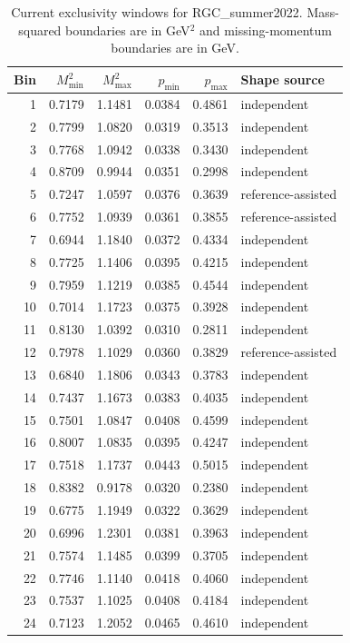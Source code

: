 \clearpage
\begin{longtable}{rrrrrl}
\caption{Current exclusivity windows for RGC\_summer2022. Mass-squared boundaries are in GeV$^2$ and missing-momentum boundaries are in GeV.}\\
\toprule Bin & $M^2_{\min}$ & $M^2_{\max}$ & $p_{\min}$ & $p_{\max}$ & Shape source\\\midrule\endhead
1 & 0.7179 & 1.1481 & 0.0384 & 0.4861 & independent\\
2 & 0.7799 & 1.0820 & 0.0319 & 0.3513 & independent\\
3 & 0.7768 & 1.0942 & 0.0338 & 0.3430 & independent\\
4 & 0.8709 & 0.9944 & 0.0351 & 0.2998 & independent\\
5 & 0.7247 & 1.0597 & 0.0376 & 0.3639 & reference-assisted\\
6 & 0.7752 & 1.0939 & 0.0361 & 0.3855 & reference-assisted\\
7 & 0.6944 & 1.1840 & 0.0372 & 0.4334 & independent\\
8 & 0.7725 & 1.1406 & 0.0395 & 0.4215 & independent\\
9 & 0.7959 & 1.1219 & 0.0385 & 0.4544 & independent\\
10 & 0.7014 & 1.1723 & 0.0375 & 0.3928 & independent\\
11 & 0.8130 & 1.0392 & 0.0310 & 0.2811 & independent\\
12 & 0.7978 & 1.1029 & 0.0360 & 0.3829 & reference-assisted\\
13 & 0.6840 & 1.1806 & 0.0343 & 0.3783 & independent\\
14 & 0.7437 & 1.1673 & 0.0383 & 0.4035 & independent\\
15 & 0.7501 & 1.0847 & 0.0408 & 0.4599 & independent\\
16 & 0.8007 & 1.0835 & 0.0395 & 0.4247 & independent\\
17 & 0.7518 & 1.1737 & 0.0443 & 0.5015 & independent\\
18 & 0.8382 & 0.9178 & 0.0320 & 0.2380 & independent\\
19 & 0.6775 & 1.1949 & 0.0322 & 0.3629 & independent\\
20 & 0.6996 & 1.2301 & 0.0381 & 0.3963 & independent\\
21 & 0.7574 & 1.1485 & 0.0399 & 0.3705 & independent\\
22 & 0.7746 & 1.1140 & 0.0418 & 0.4060 & independent\\
23 & 0.7537 & 1.1025 & 0.0408 & 0.4184 & independent\\
24 & 0.7123 & 1.2052 & 0.0465 & 0.4610 & independent\\
\bottomrule\end{longtable}
